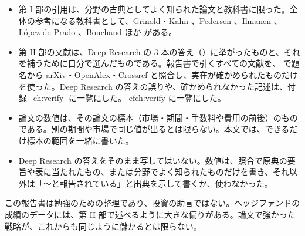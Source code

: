 \begin{itemize}
\item 第 I 部の引用は、分野の古典としてよく知られた論文と教科書に限った。全体の参考になる教科書として、Grinold・Kahn \cite{grinoldkahn2000}、Pedersen \cite{pedersen2015}、Ilmanen \cite{ilmanen2011}、López de Prado \cite{lopezdeprado2018}、Bouchaud ほか \cite{bouchaud2018} がある。
\item 第 II 部の文献は、Deep Research の 3 本の答え（）に挙がったものと、それを補うために自分で選んだものである。報告書で引くすべての文献を、 で題名から arXiv・OpenAlex・Crossref と照合し、実在が確かめられたものだけを使った。Deep Research の答えの誤りや、確かめられなかった記述は、付録~\ref{ch:verify} に一覧にした。
ef{ch:verify} に一覧にした。
\item 論文の数値は、その論文の標本（市場・期間・手数料や費用の前後）のものである。別の期間や市場で同じ値が出るとは限らない。本文では、できるだけ標本の範囲を一緒に書いた。
\item Deep Research の答えをそのまま写してはいない。数値は、照合で原典の要旨や表に当たれたもの、または分野でよく知られたものだけを書き、それ以外は「〜と報告されている」と出典を示して書くか、使わなかった。
\end{itemize}

\begin{notebox}
この報告書は勉強のための整理であり、投資の助言ではない。ヘッジファンドの成績のデータには、第 II 部で述べるように大きな偏りがある。論文で強かった戦略が、これからも同じように儲かるとは限らない。
\end{notebox}
